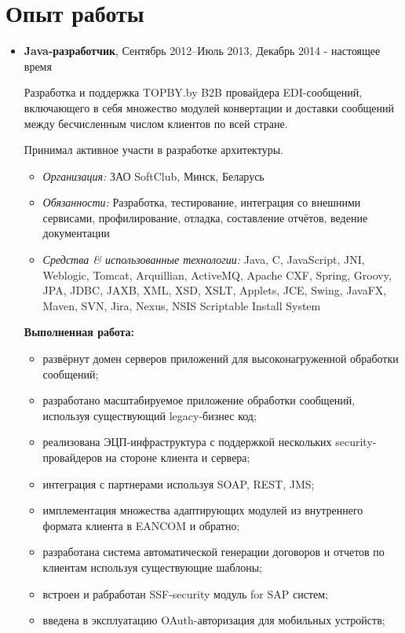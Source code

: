 \documentclass[a4paper, 12pt]{article}
\newcommand{\position}[1]{
    \textbf{#1}}
\newcommand{\itemlabel}[1]{
    \textit{#1:}}
\begin{document}
\section*{Опыт работы}

    \begin{itemize}

   
        \item \position{Java-разработчик}, Сентябрь 2012--Июль 2013, Декабрь 2014 - настоящее время

            Разработка и поддержка TOPBY.by B2B провайдера EDI-сообщений, включающего в себя множество модулей конвертации и доставки сообщений  между бесчисленным числом клиентов по всей стране.

            Принимал активное участи в разработке архитектуры.
            	
            \begin{itemize}
                \item \itemlabel{Организация} ЗАО SoftClub, Минск, Беларусь
                \item \itemlabel{Обязанности} Разработка, тестирование, интеграция со внешними сервисами, 
                \newline профилирование, отладка, составление отчётов, ведение документации
                \item \itemlabel{Средства \& использованные технологии} Java, C, JavaScript, JNI, Weblogic, Tomcat, Arquillian, ActiveMQ, Apache CXF, Spring, Groovy, JPA, JDBC, JAXB, XML, XSD, XSLT, Applets, JCE, Swing, JavaFX, Maven, SVN, Jira, Nexus, NSIS Scriptable Install System
            \end{itemize}
            
            \textbf{Выполненная работа:}
			\begin{itemize}
  				\item развёрнут домен серверов приложений для высоконагруженной обработки сообщений;
  				\item разработано масштабируемое приложение обработки сообщений, используя существующий legacy-бизнес код;
				\item реализована ЭЦП-инфраструктура с поддержкой нескольких security-провайдеров на стороне клиента и сервера;
  				\item интеграция с партнерами используя SOAP, REST, JMS;
  				\item имплементация множества адаптирующих модулей из внутреннего формата клиента в EANCOM и обратно;
  				\item разработана система автоматической генерации договоров и отчетов по клиентам используя существующие шаблоны;
  				\item встроен и рабработан SSF-security модуль for SAP систем;
  				\item введена в эксплуатацию OAuth-авторизация для мобильных устройств;
			\end{itemize}
            

\end{itemize}
\end{document}
